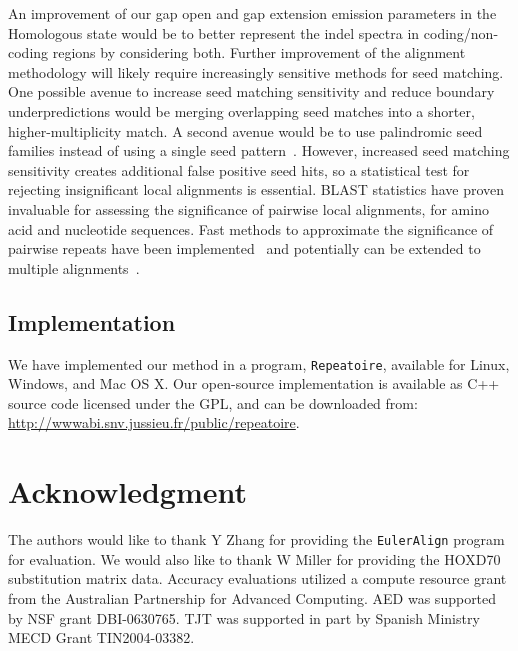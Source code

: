 \documentclass[9.5pt,journal,final,finalsubmission,twocolumn]{IEEEtran}
\begin{document}
An improvement of our gap open and gap extension emission parameters in the Homologous state would be to better represent the indel spectra in coding/non-coding regions by considering both. Further improvement of the alignment methodology will likely require increasingly sensitive methods for
seed matching. One possible avenue to increase seed matching sensitivity and reduce boundary underpredictions would be merging overlapping seed matches into a
shorter, higher-multiplicity match.  A second avenue would be to use palindromic seed families instead of using a single seed pattern~\cite{ref-pattern}. However, increased seed matching sensitivity creates additional
false positive seed hits, so a statistical test for rejecting
insignificant local alignments is essential.  BLAST statistics have proven
invaluable for assessing the significance of pairwise local alignments, for amino acid and nucleotide sequences.
Fast methods to approximate the significance of pairwise
repeats have been implemented~\cite{repseek} and potentially can be
extended to multiple alignments~\cite{ref-related1, Prakash2005}.

\subsection*{Implementation}
We have implemented our method in a program, \texttt{Repeatoire},
available for Linux, Windows, and Mac OS X. Our open-source
implementation is available as C++ source code licensed under the GPL, and can be downloaded from: \\
\url{http://wwwabi.snv.jussieu.fr/public/repeatoire}.

\section{ Acknowledgment }
The authors would like to thank Y Zhang for providing the
\texttt{EulerAlign} program for evaluation. We would also like to thank
W Miller for providing the HOXD70 substitution matrix data.  Accuracy
evaluations utilized a compute resource grant from the Australian
Partnership for Advanced Computing.  AED was supported by NSF grant
DBI-0630765. TJT was supported in part by Spanish Ministry MECD Grant
TIN2004-03382.

\end{document}
